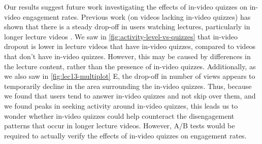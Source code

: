 \documentclass{sigchi}
\begin{document}



Our results suggest future work investigating the effects of in-video quizzes on in-video engagement rates. Previous work (on videos lacking in-video quizzes) has shown that there is a steady drop-off in users watching lectures, particularly in longer lecture videos \cite{juho}. We saw in \autoref{fig:activity-level-vs-quizzes} that in-video dropout is lower in lecture videos that have in-video quizzes, compared to videos that don't have in-video quizzes. However, this may be caused by differences in the lecture content, rather than the presence of in-video quizzes. Additionally, as we also saw in \autoref{fig:lec13-multiplot} E, the drop-off in number of views appears to temporarily decline in the area surrounding the in-video quizzes. Thus, because we found that users tend to answer in-video quizzes and not skip over them, and we found peaks in seeking activity around in-video quizzes, this leads us to wonder whether in-video quizzes could help counteract the disengagement patterns that occur in longer lecture videos. However, A/B tests would be required to actually verify the effects of in-video quizzes on engagement rates.
\end{document}
